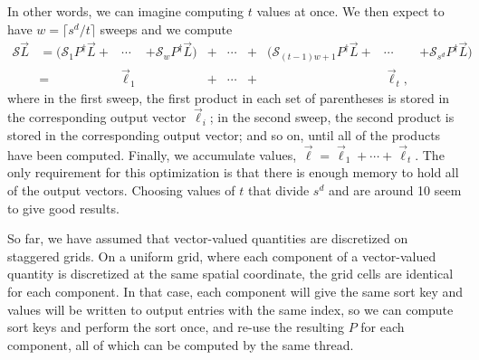 In other words, we can imagine computing $t$ values at once. We then expect to 
have $w=\lceil s^d/t\rceil$ sweeps and we compute
\begin{equation}
    \label{eq:fused-sweeps}
    \begin{alignedat}{5}
        \mathcal{S}\vec{L} 
        &= (\mathcal{S}_1P^\dagger\vec{L} + &\cdots& + \mathcal{S}_wP^\dagger\vec{L})
        &+& \cdots
        &+& (\mathcal{S}_{(t-1)w+1}P^\dagger\vec{L} + &\cdots& + \mathcal{S}_{s^d}P^\dagger\vec{L}) \\
        &=& \vec{\ell}_1 &&+& \cdots &+&& \vec{\ell}_t, &
    \end{alignedat}
\end{equation}
where in the first sweep, the first product in each set of parentheses is
stored in the corresponding output vector $\vec{\ell}_i$; in the second sweep,
the second product is stored in the corresponding output vector; and so on,
until all of the products have been computed. Finally, we accumulate values,
$\vec{\ell} = \vec{\ell}_1 + \cdots + \vec{\ell}_t$. The only requirement for
this optimization is that there is enough memory to hold all of the output
vectors. Choosing values of $t$ that divide $s^d$ and are around 10 seem to
give good results.

So far, we have assumed that vector-valued quantities are discretized on
staggered grids. On a uniform grid, where each component of a vector-valued
quantity is discretized at the same spatial coordinate, the grid cells are
identical for each component. In that case, each component will give the same
sort key and values will be written to output entries with the same index, so
we can compute sort keys and perform the sort once, and re-use the resulting
$P$ for each component, all of which can be computed by the same thread.
